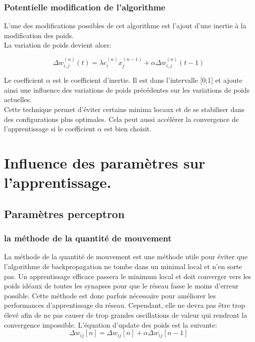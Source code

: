 \documentclass[a4paper,oneside]{report}
\begin{document}
                \subsection{Potentielle modification de l'algorithme}

                    L'une des modifications possibles de cet algorithme est l'ajout d'une inertie à la modification des poids.\\

                    La variation de poids devient alors:

                    \begin{equation}
                        \Delta w_{i,j}^{(n)}(t) = \lambda e_{i}^{(n)}x_{j}^{(n-1)} + \alpha \Delta w_{i,j}^{(n)}(t-1)
                    \end{equation}

                    Le coefficient $\alpha$ est le coefficient d'inertie. Il est dans l'intervalle [0;1] et ajoute ainsi une influence des variations de poids précédentes sur les variations de poids actuelles.\\

                    Cette technique permet d'éviter certains minima locaux et de se stabiliser dans des configurations plus optimales. Cela peut aussi accélérer la convergence de l'apprentissage si le coefficient $\alpha$ est bien choisit.


        \chapter{Influence des paramètres sur l'apprentissage.}


\section{Paramètres perceptron}

\subsection{la méthode de la quantité de mouvement}
La méthode de la quantité de mouvement est une méthode utile pour éviter que l'algorithme de backpropagation ne tombe dans un minimal local et n'en sorte pas. Un apprentissage efficace passera le minimum local et doit converger vers les poids idéaux de toutes les synapses pour que le réseau fasse le moins d'erreur possible. Cette méthode est donc parfois nécessaire pour améliorer les performances d'apprentissage du réseau. Cependant, elle ne devra pas être trop élevé afin de ne pas causer de trop grandes oscillations de valeur qui rendront la convergence impossible.
L'équation d'update des poids est la suivante:
\begin{equation}
\Delta w_{ij}[n]= \Delta w_{ij}[n]+ \alpha \Delta w_{ij}[n-1]
\end{equation}
\end{document}
